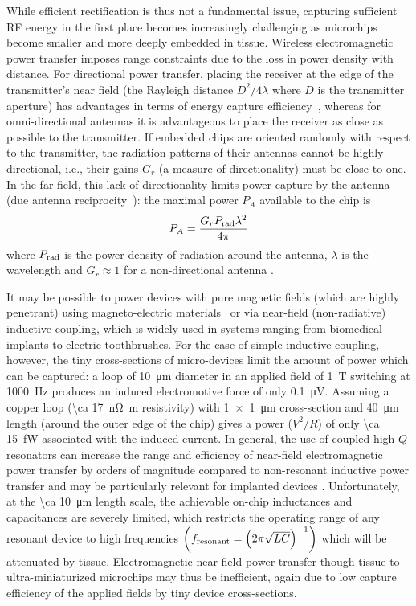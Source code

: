While efficient rectification is thus not a fundamental issue, capturing sufficient RF energy in the first place becomes increasingly challenging as microchips become smaller and more deeply embedded in tissue. Wireless electromagnetic power transfer imposes range constraints due to the loss in power density with distance.
For directional power transfer, placing the receiver at the edge of the transmitter's near field (the Rayleigh distance $D^2/4\lambda$ where $D$ is the transmitter aperture) has advantages in terms of energy capture efficiency~\cite{ozeri10}, whereas for omni-directional antennas it is advantageous to place the receiver as close as possible to the transmitter. If embedded chips are oriented randomly with respect to the transmitter, the radiation patterns of their antennas cannot be highly directional, i.e., their gains $G_r$ (a measure of directionality) must be close to one. In the far field, this lack of directionality limits power capture by the antenna (due antenna reciprocity~\cite{gershenfeld2000physics}): the maximal power $P_A$ available to the chip is \[P_A = \frac{G_r P_{\text{\scriptsize rad}} \lambda^2}{4\pi}\] where $P_{\text{\scriptsize rad}}$ is the power density of radiation around the antenna, $\lambda$ is the wavelength and $G_r \approx 1$ for a non-directional antenna \cite{mandal07}.

It may be possible to power devices with pure magnetic fields (which are highly penetrant) using magneto-electric materials~\cite{Kitagawa2010, Priya2009, Yue2012, Fiebig2005} or via near-field (non-radiative) inductive coupling, which is widely used in systems ranging from biomedical implants to electric toothbrushes. For the case of simple inductive coupling, however, the tiny cross-sections of micro-devices limit the amount of power which can be captured: a loop of \SI{10}{\micro\meter} diameter in an applied field of \SI{1}{\tesla} switching at \SI{1000}{\hertz} produces an induced electromotive force of only \SI{0.1}{\micro\volt}. Assuming a copper loop (\SI{\ca 17}{\nano\ohm\meter} resistivity) with \SI{1 x 1}{\micro\meter} cross-section and \SI{40}{\micro\meter} length (around the outer edge of the chip) gives a power ($V^2/R$) of only \SI{\ca 15}{\femto\watt} associated with the induced current. In general, the use of coupled high-$Q$ resonators can increase the range and efficiency of near-field electromagnetic power transfer by orders of magnitude \cite{Karalis2008} compared to non-resonant inductive power transfer and may be particularly relevant for implanted devices \cite{Ho2013}. Unfortunately, at the \SI{\ca 10}{\micro\meter} length scale, the achievable on-chip inductances and capacitances are severely limited, which restricts the operating range of any resonant device to high frequencies $\left( f_{\text{\scriptsize resonant}} = \left(2\pi\sqrt{LC}\right)^{-1} \right)$ which will be attenuated by tissue. Electromagnetic near-field power transfer though tissue to ultra-miniaturized microchips may thus be inefficient, again due to low capture efficiency of the applied fields by tiny device cross-sections.


